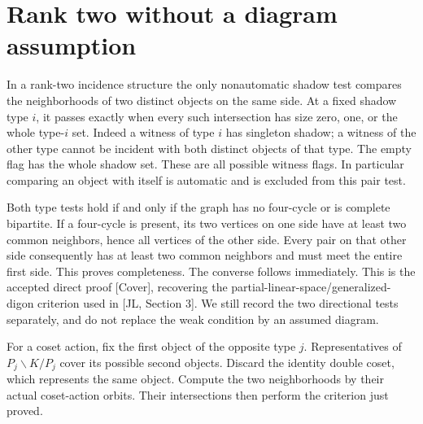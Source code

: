 \section{Rank two without a diagram assumption}
In a rank-two incidence structure the only nonautomatic shadow test
compares the neighborhoods of two distinct objects on the same side.
At a fixed shadow type $i$, it passes exactly when every such intersection
has size zero, one, or the whole type-$i$ set. Indeed a witness of type
$i$ has singleton shadow; a witness of the other type cannot be incident
with both distinct objects of that type. The empty flag has the whole
shadow set. These are all possible witness flags. In particular comparing
an object with itself is automatic and is excluded from this pair test.

Both type tests hold if and only if the graph has no four-cycle or is
complete bipartite. If a four-cycle is present, its two vertices on one
side have at least two common neighbors, hence all vertices of the other
side. Every pair on that other side consequently has at least two common
neighbors and must meet the entire first side. This proves completeness.
The converse follows immediately. This is the accepted direct proof
[Cover], recovering the partial-linear-space/generalized-digon criterion
used in [JL, Section 3]. We still record the two directional tests
separately, and do not replace the weak condition by an assumed diagram.

For a coset action, fix the first object of the opposite type $j$.
Representatives of $P_j\backslash K/P_j$ cover its possible second
objects. Discard the identity double coset, which represents the same
object. Compute the two neighborhoods by their actual coset-action
orbits. Their intersections then perform the criterion just proved.

